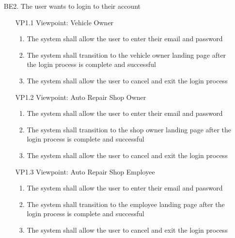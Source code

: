 \documentclass[12pt]{article}
\begin{document}
\begin{enumerate}
	\item [{BE}2.] The user wants to login to their account
	      \begin{enumerate}
		      \item [{VP1}.1] Viewpoint: Vehicle Owner
		            \begin{enumerate}
			            \item The system shall allow the user to enter their email and password
			            \item The system shall transition to the vehicle owner landing page after the login process is complete
			                  and successful
			            \item The system shall allow the user to cancel and exit the login process
		            \end{enumerate}
	      \end{enumerate}
	      \begin{enumerate}
		      \item [{VP1}.2] Viewpoint: Auto Repair Shop Owner
		            \begin{enumerate}
			            \item The system shall allow the user to enter their email and password
			            \item The system shall transition to the shop owner landing page after the login process is complete and
			                  successful
			            \item The system shall allow the user to cancel and exit the login process
		            \end{enumerate}
	      \end{enumerate}
	      \begin{enumerate}
		      \item [{VP1}.3] Viewpoint: Auto Repair Shop Employee
		            \begin{enumerate}
			            \item The system shall allow the user to enter their email and password
			            \item The system shall transition to the employee landing page after the login process is complete and
			                  successful
			            \item The system shall allow the user to cancel and exit the login process
		            \end{enumerate}
	      \end{enumerate}
\end{enumerate}
\end{document}
